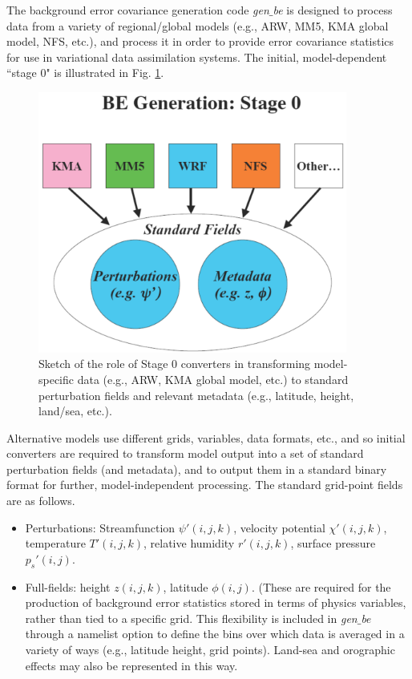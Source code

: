 The background error covariance generation code {\it gen$\_$be} is designed to process
data from a variety of regional/global models (e.g., ARW, MM5, KMA global model, 
NFS, etc.), and process it in order to provide error 
covariance statistics for use in variational data assimilation systems. The initial, 
model-dependent ``stage 0" is illustrated in Fig. \ref{var-genbe0}. 

%
%
\begin{figure}
  \centering
  \includegraphics[width=4.0in]{figures/var-genbe0.pdf}
  \caption{\label{var-genbe0}Sketch of the role of Stage 0 converters 
  in transforming model-specific data (e.g., ARW, KMA global model, etc.) to standard 
  perturbation fields and relevant metadata (e.g., latitude, height, land/sea, etc.).}
\end{figure}

Alternative models use different grids, variables, data formats, etc., and so initial converters 
are required to transform model output into a set of standard perturbation fields (and metadata), 
and to output them in a standard binary format for further, model-independent processing. The 
standard grid-point fields are as follows.

\begin{itemize}\setlength{\parskip}{-4pt}
\item
 	Perturbations: Streamfunction $\psi'(i,j,k)$, velocity potential $\chi'(i,j,k)$, 
temperature $T'(i,j,k)$, relative humidity $r'(i,j,k)$, surface pressure $p_s'(i,j)$.

\item
 	Full-fields: height $z(i,j,k)$, latitude $\phi(i,j)$. (These are required for the 
production of background error statistics stored in terms of physics variables, 
rather than tied to a specific grid. This flexibility is included in {\it gen$\_$be} through a 
namelist option to define the bins over which data is averaged in a variety of ways 
(e.g., latitude height, grid points). Land-sea and orographic effects may also be 
represented in this way.
\end{itemize}

